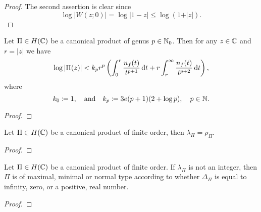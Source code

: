 \begin{proof}
    The second assertion is clear since
    $$ \log \vert W(z; 0) \vert = \log \vert 1 - z \vert \leq \log (1 + \vert z \vert). $$

\end{proof}

\begin{lemma}
    Let $\Pi \in H(\mathbb{C})$ be a canonical product of genus $p \in \mathbb{N}_0$. Then for any $z \in \mathbb{C}$ and $r = \vert z \vert$ we have
    \begin{equation}
        \log \vert \Pi(z) \vert < k_p r^p \left( \int_0^r \frac{n_f(t)}{t^{p+1}} \mathop{}\!\mathrm{d} t + r \int_r^\infty \frac{n_f(t)}{t^{p+2}} \mathop{}\!\mathrm{d} t \right),
    \end{equation}
    where
    $$ k_0 \coloneqq 1, \quad \textrm{and} \quad k_p \coloneqq 3e(p+1)(2 + \log p), \quad p \in \mathbb{N}. $$
\end{lemma}

\begin{proof}
\end{proof}

\begin{theorem} \label{thm:exponent-of-convergence-weierstrass-product}
    Let $\Pi \in H(\mathbb{C})$ be a canonical product of finite order, then $\lambda_\Pi = \rho_\Pi$.
\end{theorem}

\begin{proof}
\end{proof}

\begin{theorem}
    Let $\Pi \in H(\mathbb{C})$ be a canonical product of finite order. If $\lambda_\Pi$ is not an integer, then $\Pi$ is of maximal, minimal or normal type according to whether $\Delta_\Pi$ is equal to infinity, zero, or a positive, real number.
\end{theorem}

\begin{proof}
\end{proof}